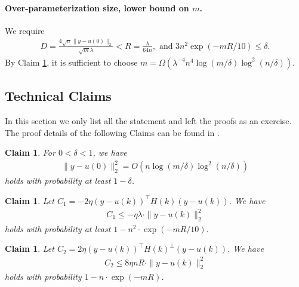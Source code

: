 \documentclass[11pt]{article}
\newtheorem{claim}[theorem]{Claim}
\begin{document}
\paragraph{Over-parameterization size, lower bound on $m$.}

We require {%
\begin{align*}
 D=  \frac{4\sqrt{n}\|y-u(0)\|_2}{\sqrt{m}\lambda} < R = \frac{\lambda}{64n} ,
\text{~and~}  3n^2\exp(-mR/10)\leq  \delta .
\end{align*}}
By Claim \ref{cla:yu0},
 it is sufficient to choose $m = \Omega( \lambda^{-4} n^4 \log(m/\delta)\log^2(n/\delta) )$.

\subsection{Technical Claims}

In this section we only list all the statement and left the proofs as an exercise. The proof details of the following Claims can be found in \cite{sy19}.
 \begin{claim}\label{cla:yu0}
For $0 < \delta < 1$, we have
\begin{align*}
\|y-u(0)\|_2^2=O(n\log(m/\delta)\log^2(n/\delta))
\end{align*}
holds with probability at least $1-\delta$.
\end{claim}



\begin{claim}\label{cla:C1}
Let $C_1 = -2 \eta (y - u(k))^\top H(k) ( y - u(k) )$. We have
\begin{align*}
C_1 \leq - \eta \lambda\cdot \| y - u(k) \|_2^2 
\end{align*}
holds with probability at least $1-n^2 \cdot \exp(-m R /10)$.
\end{claim}


\begin{claim}\label{cla:C2}
Let $C_2 = 2 \eta ( y - u(k) )^\top H(k)^{\bot} ( y - u(k) )$. We have
\begin{align*}
C_2 \leq 8\eta nR\cdot \| y - u(k) \|_2^2
\end{align*}
holds with probability $1-n\cdot \exp(-mR)$.
\end{claim}

\end{document}
